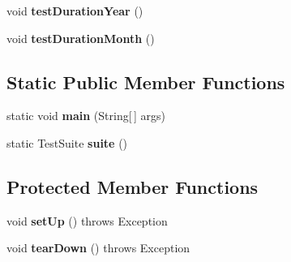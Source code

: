\begin{DoxyCompactItemize}
\item 
\hypertarget{classorg_1_1joda_1_1time_1_1chrono_1_1_test_ethiopic_chronology_ae956aa5c0df024e503c58d12bf5ae7f9}{void {\bfseries test\-Duration\-Year} ()}\label{classorg_1_1joda_1_1time_1_1chrono_1_1_test_ethiopic_chronology_ae956aa5c0df024e503c58d12bf5ae7f9}

\item 
\hypertarget{classorg_1_1joda_1_1time_1_1chrono_1_1_test_ethiopic_chronology_a54156164343dc3ce6071e34929e054ec}{void {\bfseries test\-Duration\-Month} ()}\label{classorg_1_1joda_1_1time_1_1chrono_1_1_test_ethiopic_chronology_a54156164343dc3ce6071e34929e054ec}

\end{DoxyCompactItemize}
\subsection*{Static Public Member Functions}
\begin{DoxyCompactItemize}
\item 
\hypertarget{classorg_1_1joda_1_1time_1_1chrono_1_1_test_ethiopic_chronology_aea1797758df948bc2a03e12c2d32bc4c}{static void {\bfseries main} (String\mbox{[}$\,$\mbox{]} args)}\label{classorg_1_1joda_1_1time_1_1chrono_1_1_test_ethiopic_chronology_aea1797758df948bc2a03e12c2d32bc4c}

\item 
\hypertarget{classorg_1_1joda_1_1time_1_1chrono_1_1_test_ethiopic_chronology_a83989f6c4737b998241c80360b50f926}{static Test\-Suite {\bfseries suite} ()}\label{classorg_1_1joda_1_1time_1_1chrono_1_1_test_ethiopic_chronology_a83989f6c4737b998241c80360b50f926}

\end{DoxyCompactItemize}
\subsection*{Protected Member Functions}
\begin{DoxyCompactItemize}
\item 
\hypertarget{classorg_1_1joda_1_1time_1_1chrono_1_1_test_ethiopic_chronology_a33440772dd7b24e6403e9df66874206a}{void {\bfseries set\-Up} ()  throws Exception }\label{classorg_1_1joda_1_1time_1_1chrono_1_1_test_ethiopic_chronology_a33440772dd7b24e6403e9df66874206a}

\item 
\hypertarget{classorg_1_1joda_1_1time_1_1chrono_1_1_test_ethiopic_chronology_a74677db49667badfd79cc55d6be65618}{void {\bfseries tear\-Down} ()  throws Exception }\label{classorg_1_1joda_1_1time_1_1chrono_1_1_test_ethiopic_chronology_a74677db49667badfd79cc55d6be65618}

\end{DoxyCompactItemize}


